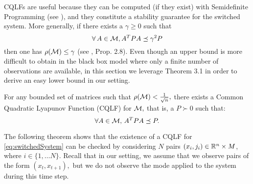 CQLFs are useful because they can be computed (if they exist) with Semidefinite Programming (see \cite{boyd}), and they constitute a stability guarantee for the switched system. More generally, if there exists a $\gamma \geq 0$ such that 
$$\forall\, A \in \mathcal{M}, A^TPA \preceq \gamma^2P$$ then one has $\rho(\mathcal{M}) \leq \gamma$ (see \cite{jungers_lncis}, Prop. 2.8). Even though an upper bound is more difficult to obtain in the black box model where only a finite number of observations are available, in this section we leverage Theorem 3.1 in order to derive an easy lower bound in our setting.

\begin{theorem}\cite[Theorem 2.11]{jungers_lncis}\label{thm:john}
For any bounded set of matrices such that $\rho(\mathcal{M})<\frac{1}{\sqrt{n}},$ there exists a Common Quadratic Lyapunov Function (CQLF) for $\mathcal{M},$ that is, a $P\succ 0$ such that: $$\forall A\in \mathcal{M},\, A^TPA\preceq P. $$
\end{theorem}

The following theorem shows that the existence of a CQLF for \eqref{eq:switchedSystem} can be checked by considering $N$ pairs $(x_i, j_i) \in \mathbb{R}^n \times M$, where $i \in \{1, \ldots N\}.$ Recall that in our setting, we assume that we observe pairs of the form $(x_t,x_{t+1}),$ but we do not observe the mode applied to the system during this time step.
%

